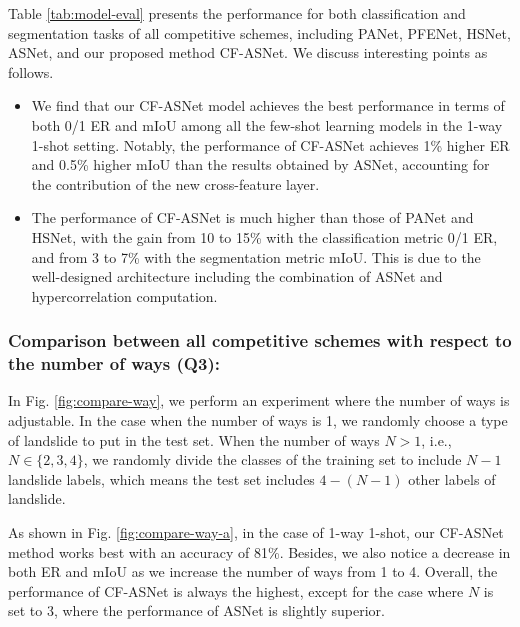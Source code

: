 \documentclass{ieeeaccess}
\newcommand{\datta}[1]{\textcolor{blue}{#1}}
\begin{document}
Table \ref{tab:model-eval} presents the performance for both classification and segmentation tasks of all competitive schemes, including PANet, PFENet, HSNet, ASNet, and our proposed method CF-ASNet. We discuss interesting points as follows.
\begin{itemize}
    \item We find that our CF-ASNet model achieves the best performance in terms of both 0/1 ER and mIoU among all the few-shot learning models in the 1-way 1-shot setting. Notably, the performance of CF-ASNet achieves 1\% higher ER and 0.5\% higher mIoU than the results obtained by ASNet, accounting for the contribution of the new cross-feature layer.
    \item The performance of CF-ASNet is much higher than those of PANet and HSNet, with the gain from 10 to 15\% with the classification metric 0/1 ER, and from 3 to 7\% with the segmentation metric mIoU. This is due to the well-designed architecture including the combination of ASNet and hypercorrelation computation.
\end{itemize}







\subsubsection{Comparison between all competitive schemes with respect to the number of ways (Q3):}

In Fig. \ref{fig:compare-way}, we perform an experiment where the number of ways is adjustable. In the case when the number of ways is 1, we randomly choose a type of landslide to put in the test set. When the number of ways $N > 1$, i.e., $N\in\{2,3,4\}$, we randomly divide the classes of the training set to include $N-1$ landslide labels, which means the test set includes $4-(N-1)$ other labels of landslide. 

As shown in Fig. \ref{fig:compare-way-a}, in the case of 1-way 1-shot,  our CF-ASNet method works best with an accuracy of 81\%. Besides, we also notice a decrease in both ER and mIoU as we increase the number of ways from 1 to 4. Overall, the performance of CF-ASNet is always the highest, except for the case where $N$ is set to 3, where the performance of ASNet is slightly superior. 
\end{document}
